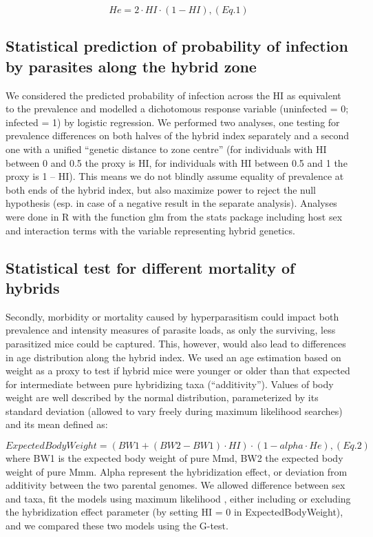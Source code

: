 \[He = 2 · HI · (1 − HI) ,           (Eq. 1)\]

\subsection{Statistical prediction of probability of infection by parasites along the hybrid zone}
We considered the predicted probability of infection across the HI as equivalent to the prevalence and modelled a dichotomous response variable (uninfected = 0; infected = 1) by logistic regression. We performed two analyses, one testing for prevalence differences on both halves of the hybrid index separately and a second one with a unified “genetic distance to zone centre” (for individuals with HI between 0 and 0.5 the proxy is HI, for individuals with HI between 0.5 and 1 the proxy is 1 – HI). This means we do not blindly assume equality of prevalence at both ends of the hybrid index, but also maximize power to reject the null hypothesis (esp. in case of a negative result in the separate analysis). Analyses were done in R with the function glm from the stats package \citep{R_2010} including host sex and interaction terms with the variable representing hybrid genetics.

\subsection{Statistical test for different mortality of hybrids}
Secondly, morbidity or mortality caused by hyperparasitism could impact both prevalence and intensity measures of parasite loads, as only the surviving, less parasitized mice could be captured. This, however, would also lead to differences in age distribution along the hybrid index. We used an age estimation based on weight \parencite[as in][]{behnke_aspiculuris_1976} as a proxy to test if hybrid mice were younger or older than that expected for intermediate between pure hybridizing taxa (“additivity”). Values of body weight are well described by the normal distribution, parameterized by its standard deviation (allowed to vary freely during maximum likelihood searches) and its mean defined as:

\[ExpectedBodyWeight = (BW1 + (BW2 − BW1) · HI) · (1 − alpha · He) ,     (Eq. 2)\]
where BW1 is the expected body weight of pure Mmd, BW2 the expected body weight of pure Mmm. Alpha represent the hybridization effect, or deviation from additivity between the two parental genomes. We allowed difference between sex and taxa, fit the models using maximum likelihood \parencite[using the R package mle2;][]{bolker_bbmle_2017}, either including or excluding the hybridization effect parameter (by setting HI = 0 in ExpectedBodyWeight), and we compared these two models using the G-test. 

